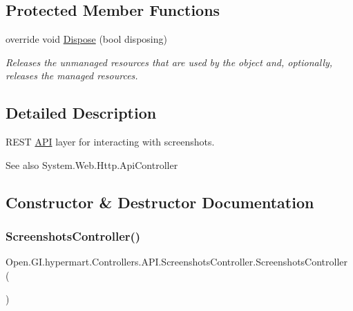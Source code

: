 \subsection*{Protected Member Functions}
\begin{DoxyCompactItemize}
\item 
override void \hyperlink{class_open_1_1_g_i_1_1hypermart_1_1_controllers_1_1_a_p_i_1_1_screenshots_controller_a63f56d0cc46aa71b08e2360e242af42d}{Dispose} (bool disposing)
\begin{DoxyCompactList}\small\item\em Releases the unmanaged resources that are used by the object and, optionally, releases the managed resources. \end{DoxyCompactList}\end{DoxyCompactItemize}


\subsection{Detailed Description}
R\+E\+ST \hyperlink{namespace_open_1_1_g_i_1_1hypermart_1_1_controllers_1_1_a_p_i}{A\+PI} layer for interacting with screenshots. 

\begin{DoxySeeAlso}{See also}
System.\+Web.\+Http.\+Api\+Controller


\end{DoxySeeAlso}


\subsection{Constructor \& Destructor Documentation}
\hypertarget{class_open_1_1_g_i_1_1hypermart_1_1_controllers_1_1_a_p_i_1_1_screenshots_controller_a38315fc7ad90feab2c072d48de02b602}{}\label{class_open_1_1_g_i_1_1hypermart_1_1_controllers_1_1_a_p_i_1_1_screenshots_controller_a38315fc7ad90feab2c072d48de02b602} 
\subsubsection{\texorpdfstring{Screenshots\+Controller()}{ScreenshotsController()}}
{\footnotesize\ttfamily Open.\+G\+I.\+hypermart.\+Controllers.\+A\+P\+I.\+Screenshots\+Controller.\+Screenshots\+Controller (\begin{DoxyParamCaption}{ }\end{DoxyParamCaption})}



